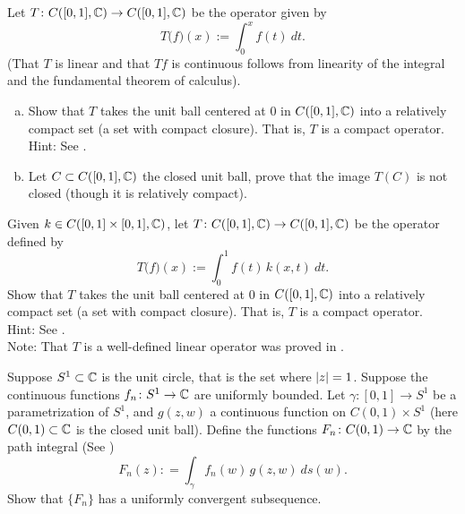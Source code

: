 \begin{exercise}
Let $T \colon C([0,1],{\mathbb{C}}) \to C([0,1],{\mathbb{C}})$ be the operator
given by
\begin{equation*}
T\bigl(f\bigr) (x) := \int_0^x f(t)~dt .
\end{equation*}
(That $T$ is linear and that $Tf$ is continuous follows from
linearity of the integral and
the fundamental theorem of calculus).
\begin{enumerate}[a)]
\item
Show that $T$ takes the unit ball centered at 0 in $C([0,1],{\mathbb{C}})$ into a
relatively compact set (a set with compact closure).
That is, $T$ is a compact operator.\\
Hint: See .
\item
Let $C \subset C([0,1],{\mathbb{C}})$ the closed unit ball,
prove that
the image $T(C)$ is not closed (though it is relatively compact).
\end{enumerate}
\end{exercise}

\begin{samepage}
\begin{exercise}
Given $k \in C([0,1]\times [0,1],{\mathbb{C}})$,
let $T \colon C([0,1],{\mathbb{C}}) \to C([0,1],{\mathbb{C}})$ be the operator
defined by
\begin{equation*}
T\bigl(f\bigr)(x) :=  \int_0^1 f(t) \, k(x,t)~dt .
\end{equation*}
Show that $T$ takes the unit ball centered at 0 in $C([0,1],{\mathbb{C}})$ into a
relatively compact set (a set with compact closure).
That is, $T$ is a compact operator.\\
Hint: See .
\\
Note: That $T$ is a well-defined linear operator was proved in
.
\end{exercise}
\end{samepage}

\begin{exercise}
Suppose $S^1 \subset {\mathbb{C}}$ is the unit circle, that is the set where
$\lvert {z} \rvert=1$.  Suppose the continuous functions
$f_n \colon S^1 \to {\mathbb{C}}$ are uniformly bounded.
Let $\gamma \colon [0,1] \to S^1$ be a parametrization of $S^1$,
and $g(z,w)$ a continuous function on $C(0,1) \times S^1$
(here $C(0,1) \subset {\mathbb{C}}$ is the closed unit ball).  Define
the functions $F_n \colon C(0,1) \to {\mathbb{C}}$ by
the path integral (See )
\begin{equation*}
F_n(z) : = \int_\gamma f_n(w)\, g(z,w) ~ ds(w) . 
\end{equation*}
Show that $\{ F_n \}$ has a uniformly convergent subsequence.
\end{exercise}

